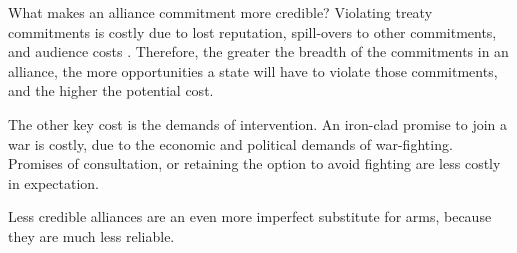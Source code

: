 \documentclass[12pt]{article}
\begin{document}
What makes an alliance commitment more credible? Violating treaty commitments is costly due to lost reputation, spill-overs to other commitments, and audience costs \citep{Fearon1997, Tomz2007ar, Chibaetal2015, Levyetal2015}. Therefore, the greater the breadth of the commitments in an alliance, the more opportunities a state will have to violate those commitments, and the higher the potential cost. 

The other key cost is the demands of intervention. An iron-clad promise to join a war is costly, due to the economic and political demands of war-fighting. Promises of consultation, or retaining the option to avoid fighting are less costly in expectation. 

Less credible alliances are an even more imperfect substitute for arms, because they are much less reliable. 










  
% 
\end{document}
